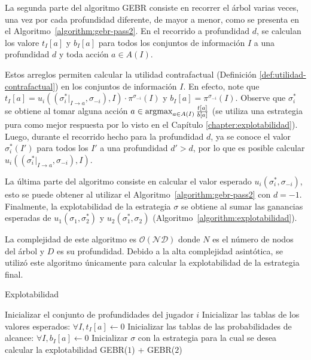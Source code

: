 La segunda parte del algoritmo GEBR consiste en recorrer el árbol varias veces, una vez por cada profundidad diferente, de mayor a menor, como se presenta en el Algoritmo~\ref{algorithm:gebr-pass2}. En el recorrido a profundidad $d$, se calculan los valore $t_I[a]$ y $b_I[a]$ para todos los conjuntos de información $I$ a una profundidad $d$ y toda acción $a \in A(I)$.

Estos arreglos permiten calcular la utilidad contrafactual (Definición \ref{def:utilidad-contrafactual}) en los conjuntos de información $I$. En efecto, note que $t_I[a] = u_i((\sigma^*_i|_{I \rightarrow a}, \sigma_{-i}),I) \cdot \pi^{\sigma_{-i}}(I)$ y $b_I[a] = \pi^{\sigma_{-i}}(I)$. Observe que $\sigma^*_i$ se obtiene al tomar alguna acción $a \in  \operatorname*{\arg\!\max}_{a \in A(I)} \frac{t[a]}{b[a]}$ (se utiliza una estrategia pura como mejor respuesta por lo visto en el Capítulo \ref{chapter:explotabilidad}). Luego, durante el recorrido hecho para la profundidad $d$, ya se conoce el valor $\sigma^*_i(I')$ para todos los $I'$ a una profundidad $d' > d$, por lo que es posible calcular  $u_i((\sigma^*_i|_{I \rightarrow a}, \sigma_{-i}),I)$.

La última parte del algoritmo consiste en calcular el valor esperado $u_i(\sigma^*_i, \sigma_{-i})$, esto se puede obtener al utilizar el Algoritmo~\ref{algorithm:gebr-pass2} con $d = -1$. Finalmente, la explotabilidad de la estrategia $\sigma$ se obtiene al sumar las ganancias esperadas de $u_1(\sigma_1, \sigma^*_2)$ y $u_2(\sigma^*_1, \sigma_2)$ (Algoritmo~\ref{algorithm:explotabilidad}).

La complejidad de este algoritmo es $\mathcal{O(ND)}$ donde $N$ es el número de nodos del árbol y $D$ es su profundidad. Debido a la alta complejidad asintótica, se utilizó este algoritmo únicamente para calcular la explotabilidad de la estrategia final.

\newpage
\begin{algorithm}[H]
\caption{Explotabilidad}
\label{algorithm:explotabilidad}
\begin{algorithmic}[1]
    \State Inicializar el conjunto de profundidades del jugador $i$
    \State Inicializar las tablas de los valores esperados: $\forall I, t_I[a] \leftarrow 0$
    \State Inicializar las tablas de las probabilidades de alcance: $\forall I, b_I[a] \leftarrow 0$
    \State Inicializar $\sigma$ con la estrategia para la cual se desea calcular la explotabilidad
    \State
        \State \Return GEBR($1$) + GEBR($2$)
    \EndFunction
\end{algorithmic}
\end{algorithm}

